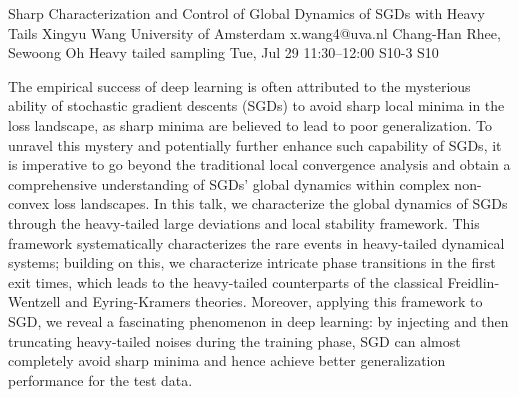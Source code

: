 \begin{talk}
  {Sharp Characterization and Control of Global Dynamics of SGDs with Heavy Tails}%
  {Xingyu Wang}%
  {University of Amsterdam}%
  {x.wang4@uva.nl}%
  {Chang-Han Rhee, Sewoong Oh}%
  {Heavy tailed sampling}%
  {Tue, Jul 29 11:30--12:00}%
  {S10-3}%
  {S10}%
    
   
The empirical success of deep learning is often attributed to the mysterious ability of stochastic gradient descents (SGDs) to avoid sharp local minima in the loss landscape, as sharp minima are believed to lead to poor generalization. To unravel this mystery and potentially further enhance such capability of SGDs, it is imperative to go beyond the traditional local convergence analysis and obtain a comprehensive understanding of SGDs' global dynamics within complex non-convex loss landscapes. In this talk, we characterize the global dynamics of SGDs through the heavy-tailed large deviations and local stability framework. This framework systematically characterizes the rare events in heavy-tailed dynamical systems; building on this, we characterize intricate phase transitions in the first exit times, which leads to the heavy-tailed counterparts of the classical Freidlin-Wentzell and Eyring-Kramers theories. Moreover, applying this framework to SGD, we reveal a fascinating phenomenon in deep learning: by injecting and then truncating heavy-tailed noises during the training phase, SGD can almost completely avoid sharp minima and hence achieve better generalization performance for the test data.



\end{talk}

